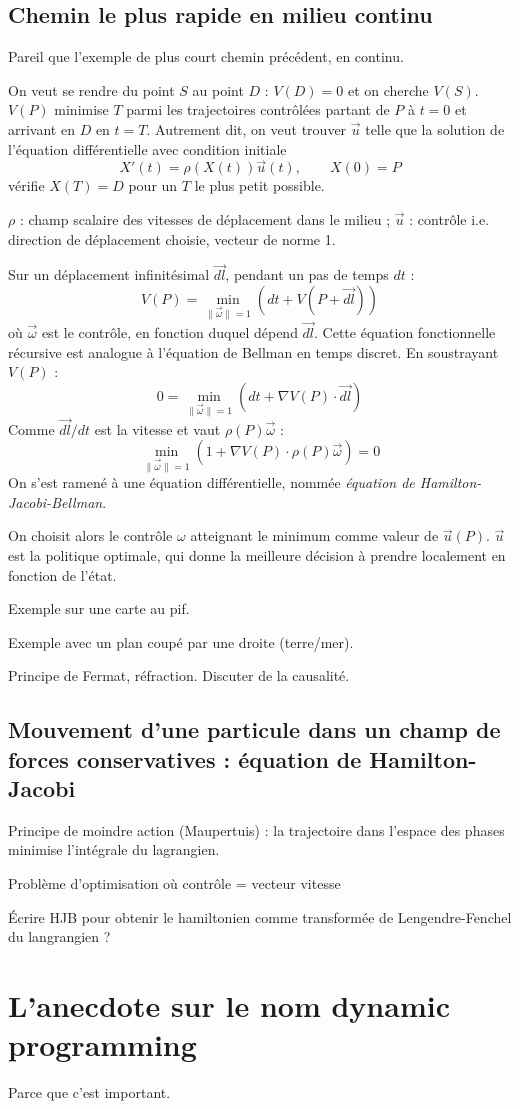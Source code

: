 \documentclass[a4paper, 11pt]{article}
\begin{document}
\subsection{Chemin le plus rapide en milieu continu}

Pareil que l'exemple de plus court chemin précédent, en continu.

On veut se rendre du point $S$ au point $D$ : $V(D) = 0$ et on cherche $V(S)$.
$V(P)$ minimise $T$ parmi les trajectoires contrôlées partant de $P$ à $t = 0$
et arrivant en $D$ en $t = T$. Autrement dit, on veut trouver $\vec{u}$ telle
que la solution de l'équation différentielle avec condition initiale
\[ X'(t) = \rho(X(t))\vec{u}(t), \qquad X(0) = P \]
vérifie $X(T) = D$ pour un $T$ le plus petit possible.

$\rho$ : champ scalaire des vitesses de déplacement dans le milieu ; $\vec{u}$ :
contrôle i.e. direction de déplacement choisie, vecteur de norme 1.

Sur un déplacement infinitésimal $\overrightarrow{dl}$, pendant un pas de temps
$dt$ :
\[ V(P) = \min_{\|\vec{\omega}\| = 1} \left( dt + V(P + \overrightarrow{dl})
  \right)\]
où $\vec{\omega}$ est le contrôle, en fonction duquel dépend $\overrightarrow{dl}$.
Cette équation fonctionnelle récursive est analogue à l'équation de Bellman en temps discret.
En soustrayant $V(P)$ :
\[ 0 = \min_{\|\vec{\omega}\| = 1} \left( dt + \nabla V(P) \cdot \overrightarrow{dl}
     \right)\]
Comme $\overrightarrow{dl}/dt$ est la vitesse et vaut $\rho(P)\vec{\omega}$ :
\[ \min_{\|\vec{\omega}\| = 1} \left( 1 + \nabla V(P) \cdot
    \rho(P)\vec{\omega} \right) = 0 \]
On s'est ramené à une équation différentielle, nommée \emph{équation de
  Hamilton-Jacobi-Bellman}.

On choisit alors le contrôle $\omega$ atteignant le minimum comme valeur de
$\vec{u}(P)$. $\vec{u}$ est la politique optimale, qui donne la meilleure
décision à prendre localement en fonction de l'état.

Exemple sur une carte au pif.

Exemple avec un plan coupé par une droite (terre/mer).

Principe de Fermat, réfraction. Discuter de la causalité.

\subsection{Mouvement d'une particule dans un champ de forces conservatives :
  équation de Hamilton-Jacobi}

Principe de moindre action (Maupertuis) : la trajectoire dans l'espace des
phases minimise l'intégrale du lagrangien.

Problème d'optimisation où contrôle = vecteur vitesse

Écrire HJB pour obtenir le hamiltonien comme transformée de Lengendre-Fenchel du
langrangien ?

\section{L'anecdote sur le nom dynamic programming}

Parce que c'est important.
\end{document}
